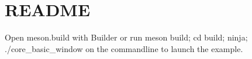 \chapter{README}
\hypertarget{md__2home_2giangvu_2CPPprog_2raylib-tetris_2build_2external_2raylib-master_2projects_2Builder_2examples_2README}{}\label{md__2home_2giangvu_2CPPprog_2raylib-tetris_2build_2external_2raylib-master_2projects_2Builder_2examples_2README}
Open {\ttfamily meson.\+build} with Builder or run {\ttfamily meson build; cd build; ninja; ./core\+\_\+basic\+\_\+window} on the commandline to launch the example. 
